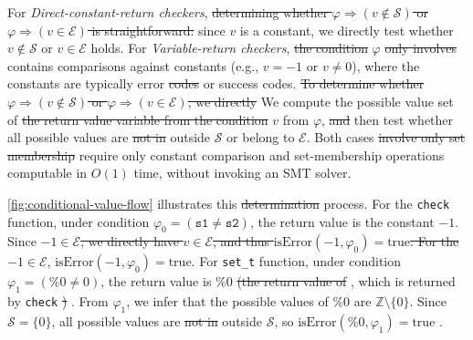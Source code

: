 \documentclass[manuscript,screen,review]{acmart}
\theoremstyle{indenteditalic}
\providecommand{\DIFaddtex}[1]{{\protect\color{blue}#1}} %
\providecommand{\DIFidentity}[1]{#1}
\providecommand{\DIFdeltex}[1]{{%
  \protect\color{red}%
  \normalfont\normalsize
  \let\textbf\DIFidentity
  \let\textit\DIFidentity
  \let\texttt\DIFidentity
  \let\textsc\DIFidentity
  \let\textsf\DIFidentity
  \let\emph\DIFidentity
  \let\uline\DIFidentity
  \sout{#1}%
}} %
\providecommand{\DIFaddbegin}{} %
\providecommand{\DIFaddend}{} %
\providecommand{\DIFdelbegin}{} %
\providecommand{\DIFdelend}{} %
\providecommand{\DIFadd}[1]{\texorpdfstring{\DIFaddtex{#1}}{#1}} %
\providecommand{\DIFdel}[1]{\texorpdfstring{\DIFdeltex{#1}}{}} %
\begin{document}
For \textit{Direct-constant-return checkers}, \DIFdelbegin \DIFdel{determining whether $\varphi \Rightarrow (v \notin \mathcal{S})$ or $\varphi \Rightarrow (v \in \mathcal{E})$ is straightforward: }\DIFdelend since $v$ is a constant, we directly test whether $v \notin \mathcal{S}$ or $v \in \mathcal{E}$ holds.
For \textit{Variable-return checkers}, \DIFdelbegin \DIFdel{the condition }\DIFdelend $\varphi$ \DIFdelbegin \DIFdel{only involves }\DIFdelend \DIFaddbegin \DIFadd{contains }\DIFaddend comparisons against constants (e.g., $v = -1$ or $v \neq 0$), where the constants are typically error \DIFdelbegin \DIFdel{codes }\DIFdelend or success codes.
\DIFdelbegin \DIFdel{To determine whether $\varphi \Rightarrow (v \notin \mathcal{S})$ or $\varphi \Rightarrow (v \in \mathcal{E})$, we directly }\DIFdelend \DIFaddbegin \DIFadd{We }\DIFaddend compute the possible value set of \DIFdelbegin \DIFdel{the return value variable from the condition }\DIFdelend \DIFaddbegin \DIFadd{$v$ from }\DIFaddend $\varphi$, \DIFdelbegin \DIFdel{and }\DIFdelend then test whether all possible values are \DIFdelbegin \DIFdel{not in }\DIFdelend \DIFaddbegin \DIFadd{outside }\DIFaddend $\mathcal{S}$ or belong to $\mathcal{E}$.
Both cases \DIFdelbegin \DIFdel{involve only set membership }\DIFdelend \DIFaddbegin \DIFadd{require only constant comparison and set-membership }\DIFaddend operations computable in $O(1)$ time\DIFaddbegin \DIFadd{, without invoking an SMT solver}\DIFaddend .

\autoref{fig:conditional-value-flow} illustrates this \DIFdelbegin \DIFdel{determination }\DIFdelend process.
For the \texttt{check} function, under condition $\varphi_0 = (\texttt{s1} \neq \texttt{s2})$, the return value is the constant $-1$.
Since \DIFdelbegin \DIFdel{$-1 \in \mathcal{E}$, we directly have $v \in \mathcal{E}$, and thus $\text{isError}(-1, \varphi_0) = \text{true}$.
For the }\DIFdelend \DIFaddbegin \DIFadd{$-1\in\mathcal{E}$, $\text{isError}(-1,\varphi_0)=\text{true}$.
For }\DIFaddend \texttt{set\_t} function, under condition $\varphi_1 = (\%0 \neq 0)$, the return value is $\%0$\DIFdelbegin \DIFdel{(the return value of }\DIFdelend \DIFaddbegin \DIFadd{, which is returned by }\DIFaddend \texttt{check}\DIFdelbegin \DIFdel{)}\DIFdelend .
From $\varphi_1$, we infer that the possible values of $\%0$ are $\mathbb{Z} \setminus \{0\}$.
Since $\mathcal{S} = \{0\}$, all possible values are \DIFdelbegin \DIFdel{not in }\DIFdelend \DIFaddbegin \DIFadd{outside }\DIFaddend $\mathcal{S}$, so $\text{isError}(\%0,\varphi_1)=\text{true}$ .
\end{document}
